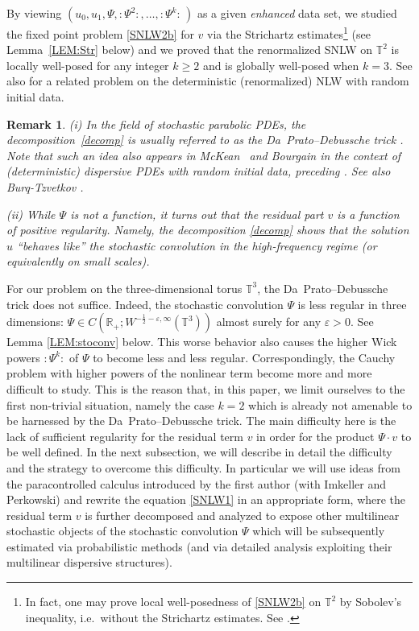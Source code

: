 \documentclass[%
11pt,  reqno]{amsart}
\newtheorem{remark}[theorem]{Remark}
\newcommand{\1}{\hspace{0.2mm}\text{I}\hspace{0.2mm}}
\newcommand{\noi}{\noindent}
\newcommand{\R}{\mathbb{R}}
\newcommand{\T}{\mathbb{T}}
\newcommand{\eps}{\varepsilon}
\numberwithin{equation}{section}
\numberwithin{theorem}{section}
\begin{document}
\noi
By viewing 
$(u_0, u_1, \Psi, :\! \Psi^2  \!:, \dots, :\! \Psi^k  \!:\,)$
as a given {\it enhanced} data set, 
we studied the fixed point problem \eqref{SNLW2b} 
for $v$  via the Strichartz estimates\footnote{In fact, one may prove local well-posedness
of \eqref{SNLW2b} on $\T^2$ by Sobolev's inequality, i.e.~without  the Strichartz estimates.
See \cite{GKOT}.}
(see Lemma~\ref{LEM:Str} below) and  we proved that the renormalized SNLW on $\T^2$ is locally well-posed
for any integer  $k \geq 2$ and is globally well-posed when $k = 3$.
See also \cite{OT2, OOTz} for a related problem
on the deterministic (renormalized) NLW with random initial data.

\begin{remark}\label{REM:behavior1}\rm 
(i) 
In the field of stochastic parabolic  PDEs, 
the decomposition~\eqref{decomp} is usually referred to as the Da~Prato--Debussche trick \cite{DPD, DPD2}.
Note that such an idea also appears in 
McKean~\cite{McKean} and 
Bourgain \cite{BO96} in the context of (deterministic) dispersive PDEs with random initial data, preceding \cite{DPD}. See also Burq-Tzvetkov \cite{BT1}.


\smallskip

\noi
(ii) While $\Psi$ is not a function, it turns out that the residual part $v$ is a function 
of positive regularity.
Namely, the decomposition \eqref{decomp} shows that 
the solution $u$  ``behaves like'' the stochastic convolution
in the high-frequency regime (or equivalently on small scales).
\end{remark}


For our problem on the three-dimensional torus $\T^3$, 
 the Da~Prato--Debussche trick does not suffice.
Indeed,  the stochastic convolution $\Psi$ 
is less regular in three dimensions: $\Psi \in C(\R_+; W^{-\frac{1}{2}-\eps, \infty}(\T^3))$ 
almost surely for any $\eps > 0$.
See Lemma \ref{LEM:stoconv} below. 
This worse behavior also causes  the higher Wick powers $:\!\Psi^k\!:$ of $\Psi$ 
to become less and less regular. 
Correspondingly, the Cauchy problem with higher powers of the nonlinear term become more and more difficult to study. 
This is the reason that, in this paper, we limit ourselves to the first non-trivial situation, 
namely the case $k=2$ which is already not amenable to be harnessed by the Da~Prato--Debussche trick. 
The main difficulty here is the lack of sufficient regularity for 
the residual term $v$ in order for the product $\Psi \cdot v$ to be well defined. 
In the next subsection, we will describe in detail the difficulty and the strategy  to overcome this difficulty.
In particular we will use ideas from the paracontrolled calculus introduced
by the first author (with Imkeller and Perkowski) \cite{GIP, CC}
and rewrite the equation \eqref{SNLW1} in an appropriate form,
 where the residual term $v$ is further decomposed and analyzed to expose 
 other multilinear stochastic objects of the stochastic convolution $\Psi$ which will be subsequently estimated via probabilistic methods (and via detailed analysis exploiting  their multilinear dispersive structures). 
\end{document}
